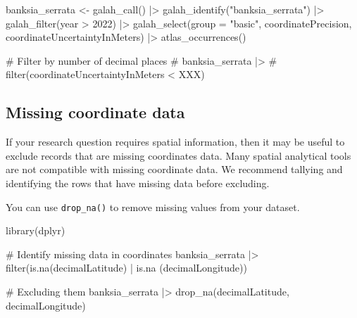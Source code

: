 \documentclass[
  letterpaper,
  DIV=11,
  numbers=noendperiod,
  oneside]{scrreprt}
\newenvironment{Shaded}{\begin{snugshade}}{\end{snugshade}}
\newcommand{\AttributeTok}[1]{\textcolor[rgb]{0.40,0.45,0.13}{#1}}
\newcommand{\CommentTok}[1]{\textcolor[rgb]{0.37,0.37,0.37}{#1}}
\newcommand{\DecValTok}[1]{\textcolor[rgb]{0.68,0.00,0.00}{#1}}
\newcommand{\FunctionTok}[1]{\textcolor[rgb]{0.28,0.35,0.67}{#1}}
\newcommand{\NormalTok}[1]{\textcolor[rgb]{0.00,0.23,0.31}{#1}}
\newcommand{\OtherTok}[1]{\textcolor[rgb]{0.00,0.23,0.31}{#1}}
\newcommand{\SpecialCharTok}[1]{\textcolor[rgb]{0.37,0.37,0.37}{#1}}
\newcommand{\StringTok}[1]{\textcolor[rgb]{0.13,0.47,0.30}{#1}}
\begin{document}
\begin{Shaded}
\begin{Highlighting}[]
\NormalTok{banksia\_serrata }\OtherTok{\textless{}{-}} \FunctionTok{galah\_call}\NormalTok{() }\SpecialCharTok{|\textgreater{}} 
  \FunctionTok{galah\_identify}\NormalTok{(}\StringTok{"banksia\_serrata"}\NormalTok{) }\SpecialCharTok{|\textgreater{}} 
  \FunctionTok{galah\_filter}\NormalTok{(year }\SpecialCharTok{\textgreater{}} \DecValTok{2022}\NormalTok{) }\SpecialCharTok{|\textgreater{}}  
  \FunctionTok{galah\_select}\NormalTok{(}\AttributeTok{group =} \StringTok{"basic"}\NormalTok{, coordinatePrecision, coordinateUncertaintyInMeters) }\SpecialCharTok{|\textgreater{}} 
  \FunctionTok{atlas\_occurrences}\NormalTok{()}

\CommentTok{\# Filter by number of decimal places}
\CommentTok{\# banksia\_serrata |\textgreater{} }
\CommentTok{\#   filter(coordinateUncertaintyInMeters \textless{} XXX) }
\end{Highlighting}
\end{Shaded}

\hypertarget{missing-coordinate-data}{%
\subsection{Missing coordinate data}\label{missing-coordinate-data}}

If your research question requires spatial information, then it may be
useful to exclude records that are missing coordinates data. Many
spatial analytical tools are not compatible with missing coordinate
data. We recommend tallying and identifying the rows that have missing
data before excluding.

You can use \texttt{drop\_na()} to remove missing values from your
dataset.

\begin{Shaded}
\begin{Highlighting}[]
\FunctionTok{library}\NormalTok{(dplyr)}

\CommentTok{\# Identify missing data in coordinates}
\NormalTok{banksia\_serrata }\SpecialCharTok{|\textgreater{}} 
  \FunctionTok{filter}\NormalTok{(}\FunctionTok{is.na}\NormalTok{(decimalLatitude) }\SpecialCharTok{|} \FunctionTok{is.na}\NormalTok{ (decimalLongitude))}

\CommentTok{\# Excluding them}
\NormalTok{banksia\_serrata }\SpecialCharTok{|\textgreater{}} 
  \FunctionTok{drop\_na}\NormalTok{(decimalLatitude, decimalLongitude)}
\end{Highlighting}
\end{Shaded}
\end{document}
